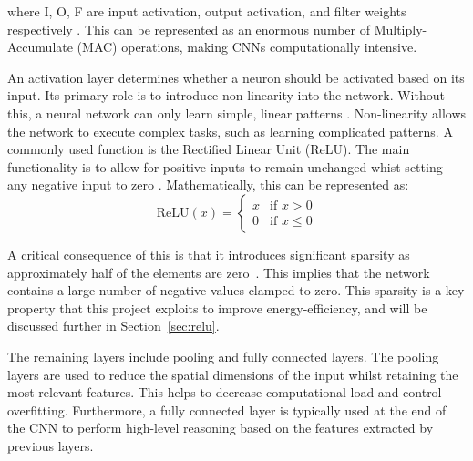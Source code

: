 \documentclass[12pt, a4paper, ukenglish]{article}
\begin{document}
    where I, O, F are input activation, output activation, and filter weights respectively \cite{choi_enabling_2023}. This can be represented as an enormous number of Multiply-Accumulate (MAC) operations, making CNNs computationally intensive. 

    An activation layer determines whether a neuron should be activated based on its input. Its primary role is to introduce non-linearity into the network. Without this, a neural network can only learn simple, linear patterns \cite{tan_vanishing_2019}. Non-linearity allows the network to execute complex tasks, such as learning complicated patterns. A commonly used function is the Rectified Linear Unit (ReLU). The main functionality is to allow for positive inputs to remain unchanged whist setting any negative input to zero \cite{parashar_scnn_2017}. Mathematically, this can be represented as:
    \begin{equation}
    \text{ReLU}(x) = 
    \begin{cases} 
        x & \text{if } x > 0 \\ 
        0 & \text{if } x \le 0 
    \end{cases}
    \end{equation}

    A critical consequence of this is that it introduces significant sparsity as approximately half of the elements are zero~\cite{sun_sense_2023}. This implies that the network contains a large number of negative values clamped to zero. This sparsity is a key property that this project exploits to improve energy-efficiency, and will be discussed further in Section~\ref{sec:relu}.

    The remaining layers include pooling and fully connected layers. The pooling layers are used to reduce the spatial dimensions of the input whilst retaining the most relevant features. This helps to decrease computational load and control overfitting. Furthermore, a fully connected layer is typically used at the end of the CNN to perform high-level reasoning based on the features extracted by previous layers\cite{cain_convolution_2021}.
\end{document}
